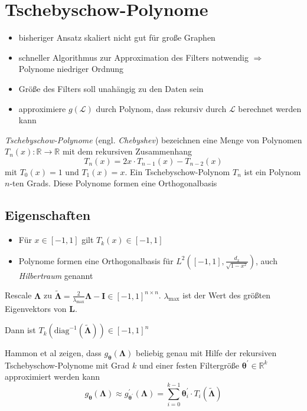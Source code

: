 \section{Tschebyschow-Polynome}

\begin{itemize}
  \item bisheriger Ansatz skaliert nicht gut für große Graphen
  \item schneller Algorithmus zur Approximation des Filters notwendig $\Rightarrow$ Polynome niedriger Ordnung
  \item Größe des Filters soll unahängig zu den Daten sein
  \item approximiere $g(\mathcal{L})$ durch Polynom, dass rekursiv durch $\mathcal{L}$ berechnet werden kann
\end{itemize}

\emph{Tschebyschow-Polynome} (engl. \emph{Chebyshev}) bezeichnen eine Menge von Polynomen $T_n(x) \colon \mathbb{R} \to \mathbb{R}$ mit dem rekursiven Zusammenhang
\begin{equation}
  T_n(x) = 2x \cdot T_{n-1}(x) - T_{n-2}(x)
\end{equation}
mit $T_0(x) = 1$ und $T_1(x) = x$.
Ein Tschebyschow-Polynom $T_n$ ist ein Polynom $n$-ten Grads.
Diese Polynome formen eine Orthogonalbasis

\subsection{Eigenschaften}

\begin{itemize}
  \item Für $x \in [-1, 1]$ gilt $T_k(x) \in [-1, 1]$
  \item Polynome formen eine Orthogonalbasis für $L^2 \left([-1, 1], \frac{d_x}{\sqrt{1-x^2}}\right)$, auch \emph{Hilbertraum} genannt
\end{itemize}

Rescale $\mathbf{\Lambda}$ zu $\mathbf{\tilde \Lambda} = \frac{2}{\lambda_{\max}} \mathbf{\Lambda} - \mathbf{I} \in {\left[-1, 1\right]}^{n \times n}$.
$\lambda_{\max}$ ist der Wert des größten Eigenvektors von $\mathbf{L}$.

Dann ist $T_k\left( \text{diag}^{-1}\left(\mathbf{\tilde \Lambda}\right) \right) \in {\left[-1, 1\right]}^{n}$

Hammon et al zeigen, dass $g_{\mathbf{\theta}}(\mathbf{\Lambda})$ beliebig genau mit Hilfe der  rekursiven Tschebyschow-Polynome mit Grad $k$ und einer festen Filtergröße $\mathbf{\theta}^{\prime} \in \mathbb{R}^k$ approximiert werden kann
\begin{equation}
  g_{\mathbf{\theta}}\left(\mathbf{\Lambda}\right) \approx g^{\prime}_{\mathbf{\theta}^{\prime}}\left(\mathbf{\Lambda}\right) = \sum_{i = 0}^{k-1} \mathbf{\theta}^{\prime}_i \cdot T_i \left(\mathbf{\tilde \Lambda}\right)
\end{equation}

